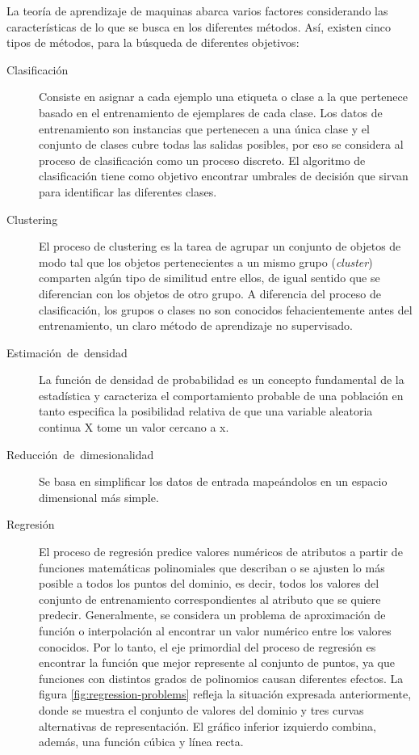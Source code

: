 La teoría de aprendizaje de maquinas abarca varios factores considerando
las características de lo que se busca en los diferentes métodos.
Así, existen cinco tipos de métodos, para la búsqueda de diferentes
objetivos:
\begin{description}
\item [{Clasificación}] Consiste en asignar a cada ejemplo una etiqueta
o clase a la que pertenece basado en el entrenamiento de ejemplares
de cada clase. Los datos de entrenamiento son instancias que pertenecen
a una única clase y el conjunto de clases cubre todas las salidas
posibles, por eso se considera al proceso de clasificación como un
proceso discreto. El algoritmo de clasificación tiene como objetivo
encontrar umbrales de decisión que sirvan para identificar las diferentes
clases.
\item [{Clustering}] El proceso de clustering es la tarea de agrupar un
conjunto de objetos de modo tal que los objetos pertenecientes a un
mismo grupo (\emph{cluster}) comparten algún tipo de similitud entre
ellos, de igual sentido que se diferencian con los objetos de otro
grupo. A diferencia del proceso de clasificación, los grupos o clases
no son conocidos fehacientemente antes del entrenamiento, un claro
método de aprendizaje no supervisado. 
\item [{Estimación~de~densidad}] La función de densidad de probabilidad
\cite{Silverman1986} es un concepto fundamental de la estadística
y caracteriza el comportamiento probable de una población en tanto
especifica la posibilidad relativa de que una variable aleatoria continua
X tome un valor cercano a x.
\item [{Reducción~de~dimesionalidad}] Se basa en simplificar los datos
de entrada mapeándolos en un espacio dimensional más simple.
\item [{Regresión}] El proceso de regresión predice valores numéricos de
atributos a partir de funciones matemáticas polinomiales que describan
o se ajusten lo más posible a todos los puntos del dominio, es decir,
todos los valores del conjunto de entrenamiento correspondientes al
atributo que se quiere predecir. Generalmente, se considera un problema
de aproximación de función o interpolación al encontrar un valor numérico
entre los valores conocidos. Por lo tanto, el eje primordial del proceso
de regresión es encontrar la función que mejor represente al conjunto
de puntos, ya que funciones con distintos grados de polinomios causan
diferentes efectos. La figura \ref{fig:regression-problems} refleja
la situación expresada anteriormente, donde se muestra el conjunto
de valores del dominio y tres curvas alternativas de representación.
El gráfico inferior izquierdo combina, además, una función cúbica
y línea recta. 
\end{description}
